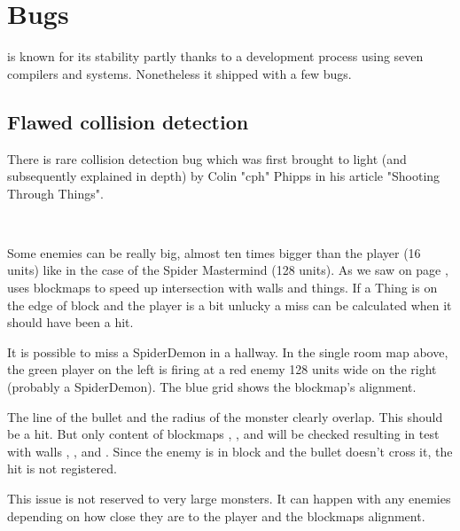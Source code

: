 \section{Bugs}
\doom{} is known for its stability partly thanks to a development process using seven compilers and systems. Nonetheless it shipped with a few bugs.








\subsection{Flawed collision detection}
There is rare collision detection bug which was first brought to light (and subsequently explained in depth) by Colin "cph" Phipps in his article "Shooting Through Things".\\
\par
{}\\
\par
Some enemies can be really big, almost ten times bigger than the player (16 units) like in the case of the Spider Mastermind (128 units). As we saw on page \pageref{E1M1_blockmap}, \doom{} uses blockmaps to speed up intersection with walls and things. If a Thing is on the edge of block and the player is a bit unlucky a miss can be calculated when it should have been a hit.

\vspace{-1cm}


\par
It is possible to miss a SpiderDemon in a hallway. In the single room map above, the green player on the left is firing at a red enemy 128 units wide on the right (probably a SpiderDemon). The blue grid shows the blockmap's alignment.\\
\par
 The line of the bullet and the radius of the monster clearly overlap. This should be a hit. But only content of blockmaps , , and  will be checked resulting in test with walls , , and . Since the enemy is in block  and the bullet doesn't cross it, the hit is not registered.\\
 \par
 This issue is not reserved to very large monsters. It can happen with any enemies depending on how close they are to the player and the blockmaps alignment.







